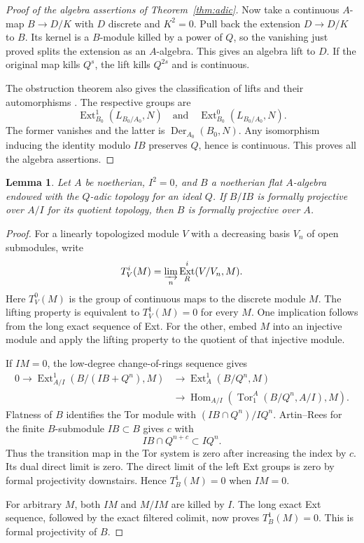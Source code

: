 \documentclass[11pt]{article}
\newtheorem{lemma}[theorem]{Lemma}
\theoremstyle{definition}\newtheorem{definition}[theorem]{Definition}
\theoremstyle{remark}\newtheorem{remark}[theorem]{Remark}
\DeclareMathOperator{\Hom}{Hom}\DeclareMathOperator{\Ext}{Ext}\DeclareMathOperator{\Tor}{Tor}
\DeclareMathOperator{\Der}{Der}\DeclareMathOperator{\Spec}{Spec}\DeclareMathOperator{\gr}{gr}
\begin{document}
\begin{proof}[Proof of the algebra assertions of Theorem~\ref{thm:adic}]
Now take a continuous $A$-map $B\to D/K$ with $D$ discrete and $K^2=0$. Pull back the extension $D\to D/K$ to $B$. Its kernel is a $B$-module killed by a power of $Q$, so the vanishing just proved splits the extension as an $A$-algebra. This gives an algebra lift to $D$. If the original map kills $Q^s$, the lift kills $Q^{2s}$ and is continuous.

The obstruction theorem also gives the classification of lifts and their automorphisms \cite[Lemma 92.16.1]{Stacks}. The respective groups are
\[
 \Ext^1_{B_0}(L_{B_0/A_0},N)\quad\text{and}\quad \Ext^0_{B_0}(L_{B_0/A_0},N).
\] The former vanishes and the latter is $\Der_{A_0}(B_0,N)$. Any isomorphism inducing the identity modulo $IB$ preserves $Q$, hence is continuous. This proves all the algebra assertions.
\end{proof}

\begin{lemma}\label{lem:formalproj}
Let $A$ be noetherian, $I^2=0$, and $B$ a noetherian flat $A$-algebra endowed with the $Q$-adic topology for an ideal $Q$. If $B/IB$ is formally projective over $A/I$ for its quotient topology, then $B$ is formally projective over $A$.
\end{lemma}
\begin{proof}
For a linearly topologized module $V$ with a decreasing basis $V_n$ of open submodules, write
\[
 T_V^i(M)=\varinjlim_n\Ext_R^i(V/V_n,M).
\]
Here $T_V^0(M)$ is the group of continuous maps to the discrete module $M$. The lifting property is equivalent to $T_V^1(M)=0$ for every $M$. One implication follows from the long exact sequence of Ext. For the other, embed $M$ into an injective module and apply the lifting property to the quotient of that injective module.

If $IM=0$, the low-degree change-of-rings sequence gives
\[
\begin{split}
0\to\Ext_{A/I}^1(B/(IB+Q^n),M)
 &\to\Ext_A^1(B/Q^n,M)\\
 &\to\Hom_{A/I}(\Tor_1^A(B/Q^n,A/I),M).
\end{split}
\]
Flatness of $B$ identifies the Tor module with $(IB\cap Q^n)/IQ^n$. Artin--Rees for the finite $B$-submodule $IB\subset B$ gives $c$ with
\[
 IB\cap Q^{n+c}\subset IQ^n.
\]
Thus the transition map in the Tor system is zero after increasing the index by $c$. Its dual direct limit is zero. The direct limit of the left Ext groups is zero by formal projectivity downstairs. Hence $T_B^1(M)=0$ when $IM=0$.

For arbitrary $M$, both $IM$ and $M/IM$ are killed by $I$. The long exact Ext sequence, followed by the exact filtered colimit, now proves $T_B^1(M)=0$. This is formal projectivity of $B$.
\end{proof}
\end{document}
